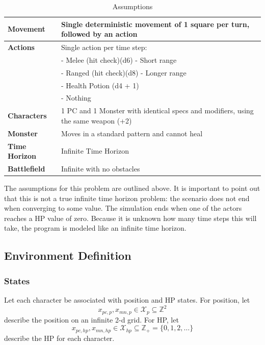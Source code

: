 \documentclass[letterpaper, 10 pt, conference]{ieeeconf}
\newcommand{\Z}{\mathbb{Z}}
\begin{document}
\begin{table}[h]
\centering
\caption{Assumptions}
\label{tab:assumptions}
\begin{tabular}{|l|p{6cm}|}
\hline
\textbf{Movement} & Single deterministic movement of 1 square per turn, followed by an action \\
\hline
\textbf{Actions} & Single action per time step: \\
& - Melee (hit check)(d6) - Short range \\
& - Ranged (hit check)(d8) - Longer range \\
& - Health Potion (d4 + 1) \\
& - Nothing \\
\hline
\textbf{Characters} & 1 PC and 1 Monster with identical specs and modifiers, using the same weapon (+2) \\
\hline
\textbf{Monster} & Moves in a standard pattern and cannot heal \\
\hline
\textbf{Time Horizon} & Infinite Time Horizon \\
\hline
\textbf{Battlefield} & Infinite with no obstacles \\
\hline
\end{tabular}
\end{table}

The assumptions for this problem are outlined above. It is important to point out that this is not a true infinite time horizon problem: the scenario does not end when converging to
some value. The simulation ends when one of the actors reaches a HP value of zero. Because it is unknown how many time steps this will take, the program is modeled like an infinite time horizon.

\subsection{Environment Definition}
\subsubsection{States}
Let each character be associated with position and HP states.
For position, let \[
    x_{pc,p}, x_{mn,p} \in \mathcal{X}_{p} \subseteq \Z^{2}
\] describe the position on an infinite 2-d grid.
For HP, let \[
    x_{pc,hp}, x_{mn,hp} \in \mathcal{X}_{hp} \subseteq \Z_+ = \{0, 1, 2, \dots\}
\] describe the HP for each character.
\end{document}
